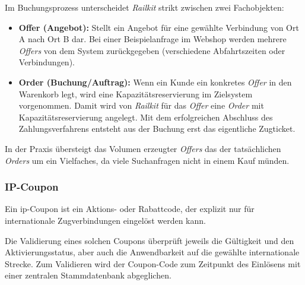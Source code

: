 Im Buchungsprozess unterscheidet \textit{Railkit} strikt zwischen zwei Fachobjekten:
\begin{itemize}
    \item \textbf{Offer (Angebot):} Stellt ein Angebot für eine gewählte Verbindung von Ort A nach Ort B dar. Bei einer Beispielanfrage im Webshop werden mehrere \textit{Offers} von dem System zurückgegeben (verschiedene Abfahrtszeiten oder Verbindungen).
    \item \textbf{Order (Buchung/Auftrag):} Wenn ein Kunde ein konkretes \textit{Offer} in den Warenkorb legt, wird eine Kapazitätsreservierung im Zielsystem vorgenommen. Damit wird von \textit{Railkit} für das \textit{Offer} eine \textit{Order} mit Kapazitätsreservierung angelegt. Mit dem erfolgreichen Abschluss des Zahlungsverfahrens entsteht aus der Buchung erst das eigentliche Zugticket.
\end{itemize}

In der Praxis übersteigt das Volumen erzeugter \textit{Offers} das der tatsächlichen \textit{Orders} um ein Vielfaches, da viele Suchanfragen nicht in einem Kauf münden.

\subsubsection{IP-Coupon}

Ein \ac{ip}-Coupon ist ein Aktions- oder Rabattcode, der explizit nur für internationale Zugverbindungen eingelöst werden kann.

Die Validierung eines solchen Coupons überprüft jeweils die Gültigkeit und den Aktivierungsstatus, aber auch die Anwendbarkeit auf die gewählte internationale Strecke. Zum Validieren wird der Coupon-Code zum Zeitpunkt des Einlösens mit einer zentralen Stammdatenbank abgeglichen. %